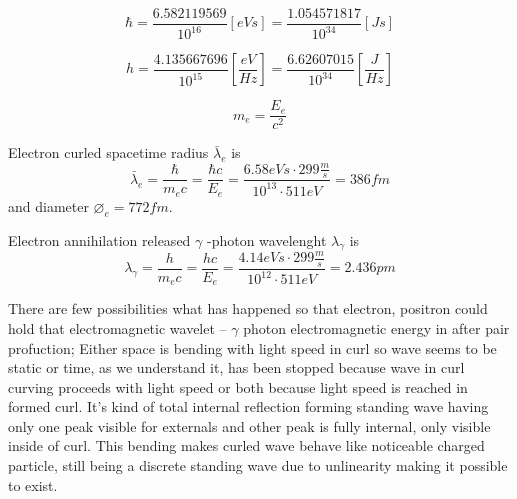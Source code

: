 \begin{equation} \label{eq:reduced_plank_constant} 
	\hbar
	= \frac{6.582119569}{10^{16}}[eVs]
	= \frac{1.054571817}{10^{34}}[Js]
\end{equation}

\begin{equation} \label{eq:plank_constant} %
	h
	= \frac{4.135667696}{10^{15}}\left[\frac{eV}{Hz}\right]
	= \frac{6.62607015}{10^{34}}\left[\frac{J}{Hz}\right]
\end{equation}

\begin{equation} \label{eq:electron_rest_mass}
	m_e=\frac{E_e}{c^2}
\end{equation}

Electron curled spacetime radius $\bar{\lambda}_e$ is
\begin{equation} \label{eq:gamma_lenght} %
	\bar{\lambda}_e=\frac{\hbar}{m_ec}
	=\frac{\hbar c}{E_e}
	=\frac{6.58eVs\cdot299\frac{m}{s}}{10^{13}\cdot511eV}
	=386fm
\end{equation}
and diameter $\diameter_e=772 fm$.


Electron annihilation released $\gamma$ -photon wavelenght $\lambda_\gamma$ is
\begin{equation} \label{eq:gamma_lenght} %
	\lambda_\gamma=\frac{h}{m_ec}
	=\frac{hc}{E_e}
	=\frac{4.14eVs\cdot299\frac{m}{s}}{10^{12}\cdot511eV}
	=2.436pm
\end{equation}

There are few possibilities what has happened so that electron, positron could
hold that electromagnetic wavelet -- $\gamma$ photon electromagnetic energy in
after pair profuction; Either space is bending with light speed in curl so wave
seems to be static or time, as we understand it, has been stopped because wave
in curl curving proceeds with light speed or both because light speed is
reached in formed curl. It's kind of total internal reflection forming standing
wave having only one peak visible for externals and other peak is fully
internal, only visible inside of curl. This bending makes curled wave behave
like noticeable charged particle, still being a discrete standing wave due to
unlinearity making it possible to exist.

